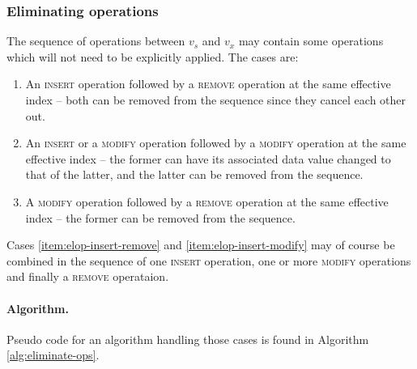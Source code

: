 \subsubsection{Eliminating operations}
The sequence of operations between $v_s$ and $v_x$ may contain some operations
which will not need to be explicitly applied. The cases are:
\begin{enumerate}
  \item An \textsc{insert} operation followed by a \textsc{remove} operation at
  the same effective index -- both can be removed from the sequence since they
  cancel each other out.
  \label{item:elop-insert-remove}

  \item An \textsc{insert} or a \textsc{modify} operation followed by a
  \textsc{modify} operation at the same effective index -- the former can have
  its associated data value changed to that of the latter, and the latter can be
  removed from the sequence.
  \label{item:elop-insert-modify}

  \item A \textsc{modify} operation followed by a \textsc{remove} operation at
  the same effective index -- the former can be removed from the sequence.
  \label{item:elop-modify-remove}
\end{enumerate}

Cases \ref{item:elop-insert-remove} and \ref{item:elop-insert-modify} may of
course be combined in the sequence of one \textsc{insert} operation, one or more
\textsc{modify} operations and finally a \textsc{remove} operataion.


\paragraph{Algorithm.}
Pseudo code for an algorithm handling those cases is found in Algorithm
\ref{alg:eliminate-ops}.

